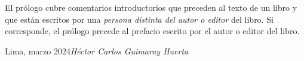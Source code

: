 \foreword

El prólogo cubre comentarios introductorios que preceden al texto de
un libro y que están escritos por una
\textit{persona distinta del autor o editor} del libro.
Si corresponde, el prólogo precede al prefacio escrito por el autor
o editor del libro.

\vspace{\baselineskip}
\begin{flushright}\noindent
    Lima, marzo 2024\hfill {\it Héctor Carlos Guimaray Huerta}
\end{flushright}
